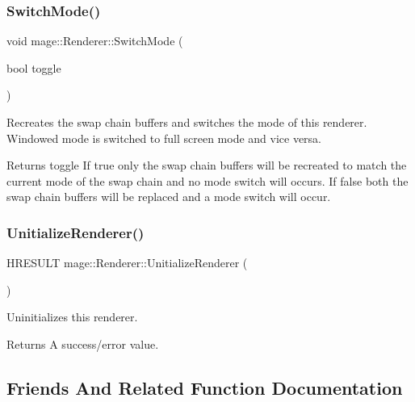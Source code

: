 \subsubsection{\texorpdfstring{Switch\+Mode()}{SwitchMode()}}
{\footnotesize\ttfamily void mage\+::\+Renderer\+::\+Switch\+Mode (\begin{DoxyParamCaption}\item[{bool}]{toggle }\end{DoxyParamCaption})}

Recreates the swap chain buffers and switches the mode of this renderer. Windowed mode is switched to full screen mode and vice versa.

\begin{DoxyReturn}{Returns}
toggle If {\ttfamily true} only the swap chain buffers will be recreated to match the current mode of the swap chain and no mode switch will occurs. If {\ttfamily false} both the swap chain buffers will be replaced and a mode switch will occur. 
\end{DoxyReturn}
\hypertarget{classmage_1_1_renderer_a308beaf67b11128f02e87778b6a9c3c7}{}\label{classmage_1_1_renderer_a308beaf67b11128f02e87778b6a9c3c7} 
\subsubsection{\texorpdfstring{Unitialize\+Renderer()}{UnitializeRenderer()}}
{\footnotesize\ttfamily H\+R\+E\+S\+U\+LT mage\+::\+Renderer\+::\+Unitialize\+Renderer (\begin{DoxyParamCaption}{ }\end{DoxyParamCaption})\hspace{0.3cm}{\ttfamily [protected]}}

Uninitializes this renderer.

\begin{DoxyReturn}{Returns}
A success/error value. 
\end{DoxyReturn}


\subsection{Friends And Related Function Documentation}
\hypertarget{classmage_1_1_renderer_a3e1914489e4bed4f9f23cdeab34a43dc}{}\label{classmage_1_1_renderer_a3e1914489e4bed4f9f23cdeab34a43dc} 
